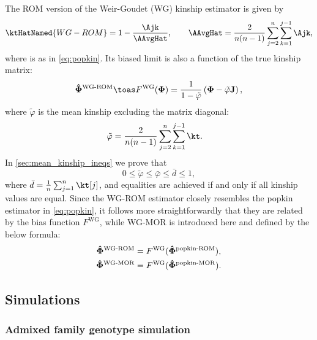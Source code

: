 \documentclass[11pt]{article}
\newcommand{\kinMat}{%
  \ensuremath{%
    \mathbf{\Phi}
  }%
  \xspace%
}%
\newcommand{\kinMatEstNamed}[1]{%
  \ensuremath{%
    \mathbf{\hat{\Phi}}^\text{#1}
  }%
  \xspace%
}%
\begin{document}
The ROM version of the Weir-Goudet (WG) kinship estimator is given by \citep{weir_unified_2017, ochoa_estimating_2021}
\begin{equation}
  \label{eq:wg}
  \ktHatNamed{WG-ROM}
  =
  1 - \frac{\Ajk}{\AAvgHat}
  , \quad\quad
  \AAvgHat
  =
  \frac{2}{n(n-1)}
  \sum_{j=2}^n
  \sum_{k=1}^{j-1}
    \Ajk
    ,
\end{equation}
where \Ajk is as in \cref{eq:popkin}.
Its biased limit is also a function of the true kinship matrix:
\begin{equation}
  \label{eq:wg_lim}
  \kinMatEstNamed{WG-ROM}
  \toas
  F^\text{WG}( \kinMat )
  =
  \frac{1}{1 - \tilde{\varphi}}
  \left(
    \kinMat
    - \tilde{\varphi} \mathbf{J}
  \right)
  ,
\end{equation}
where $\tilde{\varphi}$ is the mean kinship excluding the matrix diagonal:
\begin{equation}
  \label{eq:wg_tilde}
  \begin{split}
    \tilde{\varphi}
    &=
    \frac{2}{n(n-1)}
    \sum_{j=2}^n
    \sum_{k=1}^{j-1}
    \kt
    .
  \end{split}
\end{equation}
In \cref{sec:mean_kinship_ineqs} we prove that
$$
0 \le \tilde{\varphi} \le \bar{\varphi} \le \bar{d} \le 1,
$$
where $\bar{d} = \frac{1}{n} \sum_{j=1}^n \kt[j]$, and equalities are achieved if and only if all kinship values are equal.
Since the WG-ROM estimator closely resembles the popkin estimator in \cref{eq:popkin}, it follows more straightforwardly that they are related by the bias function $F^\text{WG}$, while WG-MOR is introduced here and defined by the below formula:
\begin{align*}
  \kinMatEstNamed{WG-ROM} &= F^\text{WG}( \kinMatEstNamed{popkin-ROM} ), \\
  \kinMatEstNamed{WG-MOR} &= F^\text{WG}( \kinMatEstNamed{popkin-MOR} )
  .
\end{align*}

\subsection{Simulations}

\subsubsection{Admixed family genotype simulation}
\end{document}
